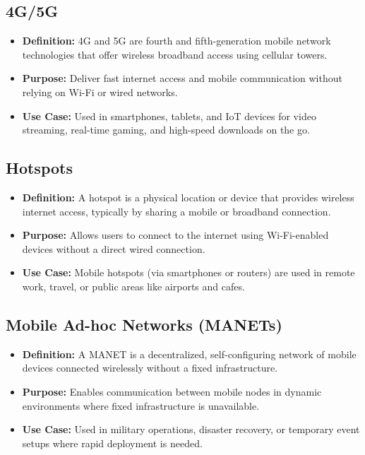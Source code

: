 \subsection{4G/5G}
\begin{itemize}[leftmargin=1.5cm]
  \item \textbf{Definition:} 4G and 5G are fourth and fifth-generation mobile network technologies that offer wireless broadband access using cellular towers.
  \item \textbf{Purpose:} Deliver fast internet access and mobile communication without relying on Wi-Fi or wired networks.
  \item \textbf{Use Case:} Used in smartphones, tablets, and IoT devices for video streaming, real-time gaming, and high-speed downloads on the go.
\end{itemize}

\subsection{Hotspots}
\begin{itemize}[leftmargin=1.5cm]
  \item \textbf{Definition:} A hotspot is a physical location or device that provides wireless internet access, typically by sharing a mobile or broadband connection.
  \item \textbf{Purpose:} Allows users to connect to the internet using Wi-Fi-enabled devices without a direct wired connection.
  \item \textbf{Use Case:} Mobile hotspots (via smartphones or routers) are used in remote work, travel, or public areas like airports and cafes.
\end{itemize}

\subsection{Mobile Ad-hoc Networks (MANETs)}
\begin{itemize}[leftmargin=1.5cm]
  \item \textbf{Definition:} A MANET is a decentralized, self-configuring network of mobile devices connected wirelessly without a fixed infrastructure.
  \item \textbf{Purpose:} Enables communication between mobile nodes in dynamic environments where fixed infrastructure is unavailable.
  \item \textbf{Use Case:} Used in military operations, disaster recovery, or temporary event setups where rapid deployment is needed.
\end{itemize}